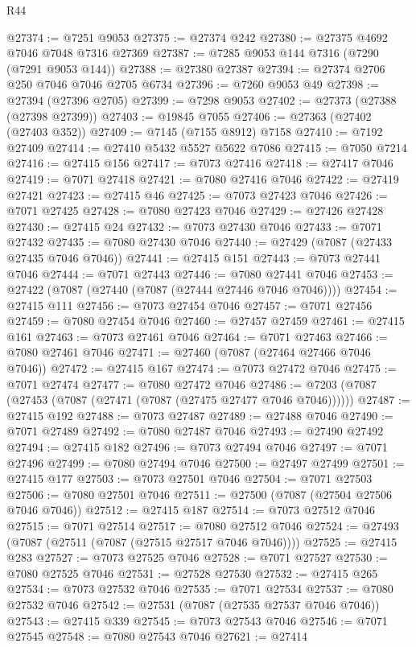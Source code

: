 \begin{lexlean}{R44}
\begin{coremodule}
{@27374 := @7251 @9053
@27375 := @27374 @242
@27380 := @27375 @4692 @7046 @7048 @7316 @27369
@27387 := @7285 @9053 @144 @7316 (@7290 (@7291 @9053 @144))
@27388 := @27380 @27387
@27394 := @27374 @2706 @250 @7046 @7046 @2705 @6734
@27396 := @7260 @9053 @49
@27398 := @27394 (@27396 @2705)
@27399 := @7298 @9053
@27402 := @27373 (@27388 (@27398 @27399))
@27403 := @19845 @7055
@27406 := @27363 (@27402 (@27403 @352))
@27409 := @7145 (@7155 @8912) @7158
@27410 := @7192 @27409
@27414 := @27410 @5432 @5527 @5622 @7086
@27415 := @7050 @7214
@27416 := @27415 @156
@27417 := @7073 @27416
@27418 := @27417 @7046
@27419 := @7071 @27418
@27421 := @7080 @27416 @7046
@27422 := @27419 @27421
@27423 := @27415 @46
@27425 := @7073 @27423 @7046
@27426 := @7071 @27425
@27428 := @7080 @27423 @7046
@27429 := @27426 @27428
@27430 := @27415 @24
@27432 := @7073 @27430 @7046
@27433 := @7071 @27432
@27435 := @7080 @27430 @7046
@27440 := @27429 (@7087 (@27433 @27435 @7046 @7046))
@27441 := @27415 @151
@27443 := @7073 @27441 @7046
@27444 := @7071 @27443
@27446 := @7080 @27441 @7046
@27453 := @27422 (@7087 (@27440 (@7087 (@27444 @27446 @7046 @7046))))
@27454 := @27415 @111
@27456 := @7073 @27454 @7046
@27457 := @7071 @27456
@27459 := @7080 @27454 @7046
@27460 := @27457 @27459
@27461 := @27415 @161
@27463 := @7073 @27461 @7046
@27464 := @7071 @27463
@27466 := @7080 @27461 @7046
@27471 := @27460 (@7087 (@27464 @27466 @7046 @7046))
@27472 := @27415 @167
@27474 := @7073 @27472 @7046
@27475 := @7071 @27474
@27477 := @7080 @27472 @7046
@27486 := @7203 (@7087 (@27453 (@7087 (@27471 (@7087 (@27475 @27477 @7046 @7046))))))
@27487 := @27415 @192
@27488 := @7073 @27487
@27489 := @27488 @7046
@27490 := @7071 @27489
@27492 := @7080 @27487 @7046
@27493 := @27490 @27492
@27494 := @27415 @182
@27496 := @7073 @27494 @7046
@27497 := @7071 @27496
@27499 := @7080 @27494 @7046
@27500 := @27497 @27499
@27501 := @27415 @177
@27503 := @7073 @27501 @7046
@27504 := @7071 @27503
@27506 := @7080 @27501 @7046
@27511 := @27500 (@7087 (@27504 @27506 @7046 @7046))
@27512 := @27415 @187
@27514 := @7073 @27512 @7046
@27515 := @7071 @27514
@27517 := @7080 @27512 @7046
@27524 := @27493 (@7087 (@27511 (@7087 (@27515 @27517 @7046 @7046))))
@27525 := @27415 @283
@27527 := @7073 @27525 @7046
@27528 := @7071 @27527
@27530 := @7080 @27525 @7046
@27531 := @27528 @27530
@27532 := @27415 @265
@27534 := @7073 @27532 @7046
@27535 := @7071 @27534
@27537 := @7080 @27532 @7046
@27542 := @27531 (@7087 (@27535 @27537 @7046 @7046))
@27543 := @27415 @339
@27545 := @7073 @27543 @7046
@27546 := @7071 @27545
@27548 := @7080 @27543 @7046
@27621 := @27414
}
\end{coremodule}
\end{lexlean}

